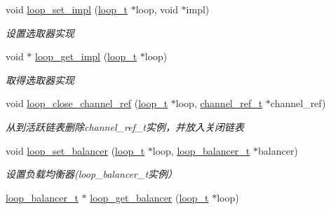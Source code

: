 \begin{DoxyCompactItemize}
void \hyperlink{a00062_aa9654f1b872059f74665506fd67c9bc5_aa9654f1b872059f74665506fd67c9bc5}{loop\+\_\+set\+\_\+impl} (\hyperlink{a00047_a9c3ad1cd2de83e09f3a7b59fa82c94ee_a9c3ad1cd2de83e09f3a7b59fa82c94ee}{loop\+\_\+t} $\ast$loop, void $\ast$impl)
\begin{DoxyCompactList}\small\item\em 设置选取器实现 \end{DoxyCompactList}\item 
void $\ast$ \hyperlink{a00062_a0f78295541723911955dd41b71ceece1_a0f78295541723911955dd41b71ceece1}{loop\+\_\+get\+\_\+impl} (\hyperlink{a00047_a9c3ad1cd2de83e09f3a7b59fa82c94ee_a9c3ad1cd2de83e09f3a7b59fa82c94ee}{loop\+\_\+t} $\ast$loop)
\begin{DoxyCompactList}\small\item\em 取得选取器实现 \end{DoxyCompactList}\item 
void \hyperlink{a00062_a9328cf8ba2faccbf363b41e524631b75_a9328cf8ba2faccbf363b41e524631b75}{loop\+\_\+close\+\_\+channel\+\_\+ref} (\hyperlink{a00047_a9c3ad1cd2de83e09f3a7b59fa82c94ee_a9c3ad1cd2de83e09f3a7b59fa82c94ee}{loop\+\_\+t} $\ast$loop, \hyperlink{a00047_a151271c9d188ef28d4d24bb81dcc1263_a151271c9d188ef28d4d24bb81dcc1263}{channel\+\_\+ref\+\_\+t} $\ast$channel\+\_\+ref)
\begin{DoxyCompactList}\small\item\em 从到活跃链表删除channel\+\_\+ref\+\_\+t实例，并放入关闭链表 \end{DoxyCompactList}\item 
void \hyperlink{a00062_abedbb538c1cc8ef805dbfc0f58d80f9e_abedbb538c1cc8ef805dbfc0f58d80f9e}{loop\+\_\+set\+\_\+balancer} (\hyperlink{a00047_a9c3ad1cd2de83e09f3a7b59fa82c94ee_a9c3ad1cd2de83e09f3a7b59fa82c94ee}{loop\+\_\+t} $\ast$loop, \hyperlink{a00047_a649c7e850ab247b5f70ad27e335a129d_a649c7e850ab247b5f70ad27e335a129d}{loop\+\_\+balancer\+\_\+t} $\ast$balancer)
\begin{DoxyCompactList}\small\item\em 设置负载均衡器(loop\+\_\+balancer\+\_\+t实例） \end{DoxyCompactList}\item 
\hyperlink{a00047_a649c7e850ab247b5f70ad27e335a129d_a649c7e850ab247b5f70ad27e335a129d}{loop\+\_\+balancer\+\_\+t} $\ast$ \hyperlink{a00062_a1f9df6866c80e91a620320298d199315_a1f9df6866c80e91a620320298d199315}{loop\+\_\+get\+\_\+balancer} (\hyperlink{a00047_a9c3ad1cd2de83e09f3a7b59fa82c94ee_a9c3ad1cd2de83e09f3a7b59fa82c94ee}{loop\+\_\+t} $\ast$loop)

\end{DoxyCompactItemize}
